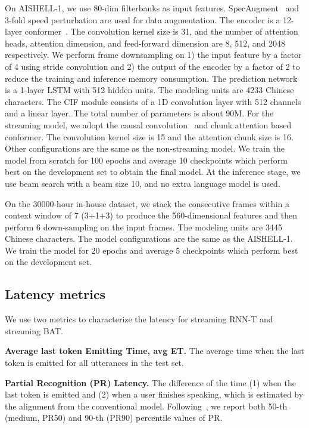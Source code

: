 \documentclass{INTERSPEECH2023}
\begin{document}
On AISHELL-1, we use 80-dim filterbanks as input features. SpecAugment~\cite{specaug} and 3-fold speed perturbation are used for data augmentation. The encoder is a 12-layer conformer~\cite{Conformer}. The convolution kernel size is 31, and the number of attention heads, attention dimension, and feed-forward dimension are 8, 512, and 2048 respectively. We perform frame downsampling on 1) the input feature by a factor of 4 using stride convolution and 2) the output of the encoder by a factor of 2 to reduce the training and inference memory consumption. The prediction network is a 1-layer LSTM with 512 hidden units. The modeling units are 4233 Chinese characters. The CIF module consists of a 1D convolution layer with 512 channels and a linear layer. The total number of parameters is about 90M. For the streaming model, we adopt the causal convolution~\cite{Transformer-Transducer} and chunk attention based conformer. The convolution kernel size is 15 and the attention chunk size is 16. Other configurations are the same as the non-streaming model. We train the model from scratch for 100 epochs and average 10 checkpoints which perform best on the development set to obtain the final model. At the inference stage, we use beam search with a beam size 10, and no extra language model is used. 

On the 30000-hour in-house dataset, we stack the consecutive frames within a context window of 7 (3+1+3) to produce the 560-dimensional features and then perform 6 down-sampling on the input frames. The modeling units are 3445 Chinese characters. The model configurations are the same as the AISHELL-1. We train the model for 20 epochs and average 5 checkpoints which perform best on the development set.
\subsection{Latency metrics}
We use two metrics to characterize the latency for streaming RNN-T and streaming BAT.

\textbf{Average last token Emitting Time, avg ET.} The average time when the last token is emitted for all utterances in the test set.

\textbf{Partial Recognition (PR) Latency.}  The difference of the time (1) when the last token is emitted and (2) when a user finishes speaking, which is estimated by the alignment from the conventional model. Following~\cite{fastemit}, we report both 50-th (medium, PR50) and 90-th (PR90) percentile values of PR.
\end{document}
